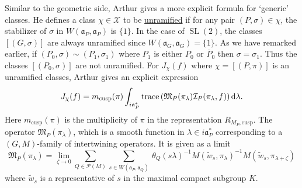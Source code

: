 \documentclass[11pt]{amsart}
\def\III{\mathcal I}
\def\MMM{\mathfrak M}	%
\def\PPP{\mathcal P}
\def\XXX{\mathcal X}
\def\aaa{\mathfrak a}
\def\cb#1{{\color{blue}#1}}
\def\d{\text d}
\def\cusp{\text{cusp}}
\def\oP{\overline{P}}
\def\sl{\operatorname{SL}}
\def\trace{\operatorname{trace}}
\theoremstyle{remark}
\begin{document}
Similar to the geometric side, Arthur gives a more explicit formula for `generic' classes. He defines a class $\chi \in \XXX$ to be \underline{unramified} if for any pair $(P, \sigma) \in \chi$, the stabilizer of $\sigma$ in $W(\aaa_P, \aaa_P)$ is $\{1\}$. \cb{In the case of $\sl(2)$, the classes $[(G, \sigma)]$ are always unramified since $W(\aaa_G, \aaa_G) = \{1\}$. As we have remarked earlier, if $(P_0, \sigma) \sim (P_1, \sigma_1)$ where $P_1$ is either $P_0$ or $\oP_0$ then $\sigma = \sigma_1$. Thus the classes $[(P_0, \sigma)]$ are not unramified. 
}
For $J_\chi(f)$ where $\chi = [(P, \pi)]$ is an unramified classes, Arthur gives an explicit expression
\[ J_\chi(f) = m_{\cusp}(\pi) \int_{i\aaa_P^*} \trace\left(\MMM_P(\pi_\lambda) \III_P(\pi_\lambda, f)\right) \d \lambda. \]
Here $m_{\cusp}(\pi)$ is the multiplicity of $\pi$ in the representation $R_{M_P, \cusp}$. The operator $\MMM_P(\pi_\lambda)$, which is a smooth function in $\lambda \in i\aaa_P^*$ corresponding to a $(G, M)$-family of intertwining operators. It is given as a limit
\[ \MMM_P(\pi_\lambda) = \lim_{\zeta \to 0} \sum_{Q \in \PPP(M)} \sum_{s \in W(\aaa_P, \aaa_Q)} \
		\theta_Q(s\lambda)^{-1} M(\tilde w_s, \pi_\lambda)^{-1} M(\tilde w_s, \pi_{\lambda + \zeta}) \]
where $\tilde w_s$ is a representative of $s$ in the maximal compact subgroup $K$. 
\end{document}
